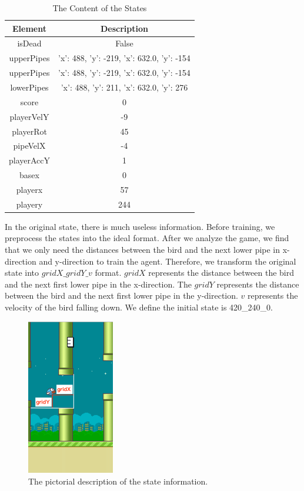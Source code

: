 \documentclass[conference,compsoc]{IEEEtran}
\begin{document}
\begin{table}[!t]
\renewcommand{\arraystretch}{1.3}
\caption{The Content of the States}
\label{table_1}
\centering
\begin{tabular}{|c|c|}
\hline
Element & Description\\
\hline
isDead & False\\
\hline
upperPipes & {'x': 488, 'y': -219}, {'x': 632.0, 'y': -154}\\
\hline
upperPipes & {'x': 488, 'y': -219}, {'x': 632.0, 'y': -154}\\
\hline
lowerPipes &{'x': 488, 'y': 211}, {'x': 632.0, 'y': 276}\\
\hline
score & 0\\
\hline
playerVelY &-9\\
\hline
playerRot & 45\\
\hline
pipeVelX & -4\\
\hline
playerAccY & 1\\
\hline
basex & 0\\
\hline
playerx & 57\\
\hline
playery &244\\
\hline
\end{tabular}
\end{table}


In the original state, there is much useless information. Before training, we preprocess the states into the ideal format. After we analyze the game, we find that we only need the distances between the bird and the next lower pipe in x-direction and y-direction to train the agent. Therefore, we transform the original state into ${gridX\_gridY\_v}$ format. ${gridX}$ represents the distance between the bird and the next first lower pipe in the x-direction. The ${gridY}$ represents the distance between the bird and the next first lower pipe in the y-direction. ${v}$ represents the velocity of the bird falling down. We define the initial state is 420\_240\_0.

\begin{figure}[!t]
\centering
\includegraphics[width=1.5in]{fg2.png}
\caption{The pictorial description of the state information.}
\label{fig_2}
\end{figure}
\end{document}
